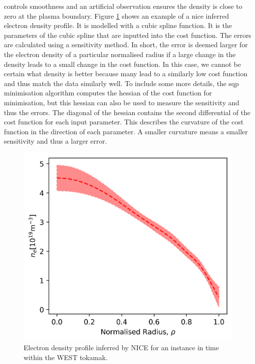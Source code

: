 controls smoothness and an artificial observation ensures the density is close to zero at the plasma boundary. Figure \ref{fig:nice_example} shows an example of a \gls{nice} inferred electron density profile. It is modelled with a cubic spline function. It is the parameters of the cubic spline that are inputted into the cost function. The errors are calculated using a sensitivity method. In short, the error is deemed larger for the electron density of a particular normalised radius if a large change in the density leads to a small change in the cost function. In this case, we cannot be certain what density is better because many lead to a similarly low cost function and thus match the data similarly well. To include some more details, the \gls{sqp} minimisation algorithm computes the hessian of the cost function for minimisation, but this hessian can also be used to measure the sensitivity and thus the errors. The diagonal of the hessian contains the second differential of the cost function for each input parameter. This describes the curvature of the cost function in the direction of each parameter. A smaller curvature means a smaller sensitivity and thus a larger error.

\begin{figure}
  \centering
  \includegraphics[width=13cm]{images/niceExample.png}
  \caption{Electron density profile inferred by NICE for an instance in time within the WEST tokamak.}
  \label{fig:nice_example}
\end{figure}

